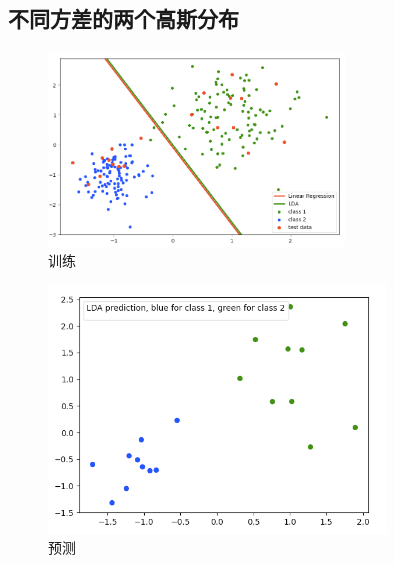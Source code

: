 \documentclass{article}
\begin{document}
\subsection*{不同方差的两个高斯分布} %
\label{sub:不同方差的两个高斯分布}
	\begin{figure}[H]
		\centering
		\includegraphics[width=0.7\textwidth]{Img/diff_train.png}
		\caption{训练}
	\end{figure}
	\begin{figure}[H]
		\centering
		\includegraphics[width=0.8\textwidth]{Img/diff_predict.png}
		\caption{预测}
	\end{figure}

\end{document}
